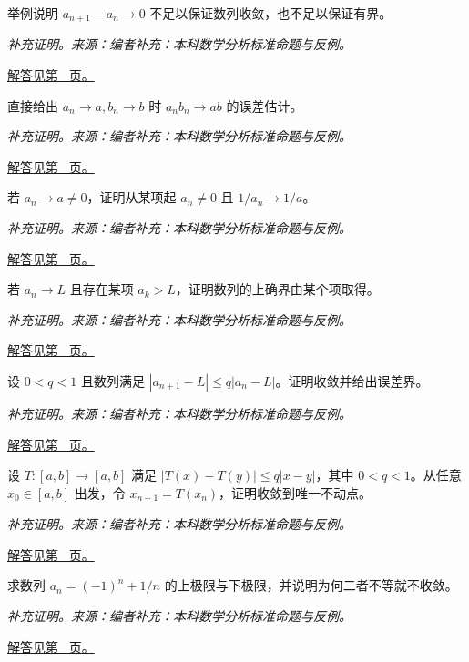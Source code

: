 \documentclass[12pt,fontset=fandol]{ctexart}
\begin{document}
\begin{example}[相邻差趋零并不保证收敛]\label{ex:c2q14}
举例说明 $a_{n+1}-a_n\to0$ 不足以保证数列收敛，也不足以保证有界。
\par\textit{补充证明。来源：编者补充：本科数学分析标准命题与反例。}\par\hyperref[ans:c2q14]{解答见第~\pageref{ans:c2q14} 页。}
\end{example}
\begin{example}[乘积数列的极限]\label{ex:c2q15}
直接给出 $a_n\to a,b_n\to b$ 时 $a_nb_n\to ab$ 的误差估计。
\par\textit{补充证明。来源：编者补充：本科数学分析标准命题与反例。}\par\hyperref[ans:c2q15]{解答见第~\pageref{ans:c2q15} 页。}
\end{example}
\begin{example}[倒数数列的极限]\label{ex:c2q16}
若 $a_n\to a\ne0$，证明从某项起 $a_n\ne0$ 且 $1/a_n\to1/a$。
\par\textit{补充证明。来源：编者补充：本科数学分析标准命题与反例。}\par\hyperref[ans:c2q16]{解答见第~\pageref{ans:c2q16} 页。}
\end{example}
\begin{example}[收敛数列与极值取得]\label{ex:c2q17}
若 $a_n\to L$ 且存在某项 $a_k>L$，证明数列的上确界由某个项取得。
\par\textit{补充证明。来源：编者补充：本科数学分析标准命题与反例。}\par\hyperref[ans:c2q17]{解答见第~\pageref{ans:c2q17} 页。}
\end{example}
\begin{example}[递推压缩的几何误差]\label{ex:c2q18}
设 $0<q<1$ 且数列满足 $|a_{n+1}-L|\le q|a_n-L|$。证明收敛并给出误差界。
\par\textit{补充证明。来源：编者补充：本科数学分析标准命题与反例。}\par\hyperref[ans:c2q18]{解答见第~\pageref{ans:c2q18} 页。}
\end{example}
\begin{example}[递推收敛与不动点存在]\label{ex:c2q19}
设 $T:[a,b]\to[a,b]$ 满足 $|T(x)-T(y)|\le q|x-y|$，其中 $0<q<1$。从任意 $x_0\in[a,b]$ 出发，令 $x_{n+1}=T(x_n)$，证明收敛到唯一不动点。
\par\textit{补充证明。来源：编者补充：本科数学分析标准命题与反例。}\par\hyperref[ans:c2q19]{解答见第~\pageref{ans:c2q19} 页。}
\end{example}
\begin{example}[上、下极限的简单计算]\label{ex:c2q20}
求数列 $a_n=(-1)^n+1/n$ 的上极限与下极限，并说明为何二者不等就不收敛。
\par\textit{补充证明。来源：编者补充：本科数学分析标准命题与反例。}\par\hyperref[ans:c2q20]{解答见第~\pageref{ans:c2q20} 页。}
\end{example}
\end{document}
